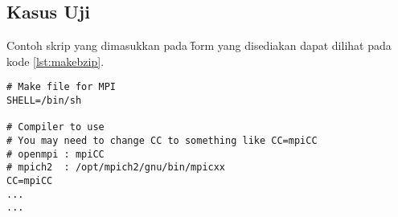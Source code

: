 \subsection{Kasus Uji}
Contoh skrip yang dimasukkan pada \f{form} yang disediakan dapat dilihat pada kode \ref{lst:makebzip}.
\begin{lstlisting}[caption={Potongan \co{Makefile} \f{project}}, label={lst:makebzip},style=shell]
# Make file for MPI
SHELL=/bin/sh

# Compiler to use
# You may need to change CC to something like CC=mpiCC
# openmpi : mpiCC
# mpich2  : /opt/mpich2/gnu/bin/mpicxx
CC=mpiCC
...
...
\end{lstlisting}